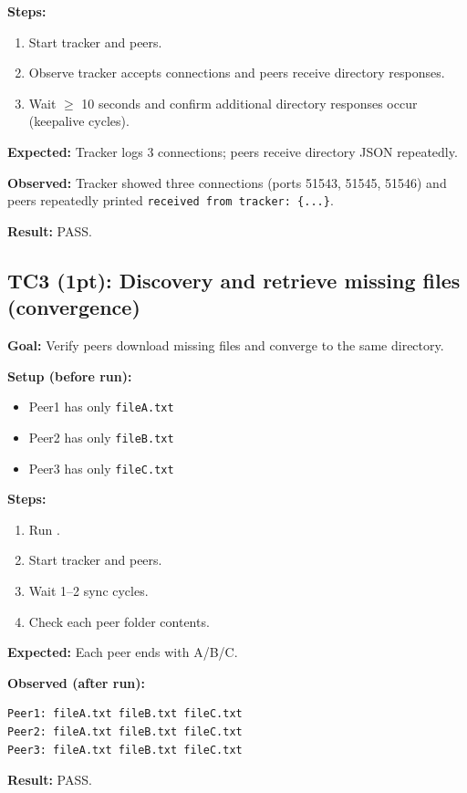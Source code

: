 \documentclass[11pt]{article}
\begin{document}
\textbf{Steps:}
\begin{enumerate}[noitemsep]
  \item Start tracker and peers.
  \item Observe tracker accepts connections and peers receive directory responses.
  \item Wait $\ge$ 10 seconds and confirm additional directory responses occur (keepalive cycles).
\end{enumerate}

\textbf{Expected:} Tracker logs 3 connections; peers receive directory JSON repeatedly.

\textbf{Observed:} Tracker showed three connections (ports 51543, 51545, 51546) and peers repeatedly printed \texttt{received from tracker: \{...\}}.

\textbf{Result:} PASS.

\subsection{TC3 (1pt): Discovery and retrieve missing files (convergence)}
\textbf{Goal:} Verify peers download missing files and converge to the same directory.

\textbf{Setup (before run):}
\begin{itemize}[noitemsep]
  \item Peer1 has only \texttt{fileA.txt}
  \item Peer2 has only \texttt{fileB.txt}
  \item Peer3 has only \texttt{fileC.txt}
\end{itemize}

\textbf{Steps:}
\begin{enumerate}[noitemsep]
  \item Run .
  \item Start tracker and peers.
  \item Wait 1--2 sync cycles.
  \item Check each peer folder contents.
\end{enumerate}

\textbf{Expected:} Each peer ends with A/B/C.

\textbf{Observed (after run):}
\begin{lstlisting}
Peer1: fileA.txt fileB.txt fileC.txt
Peer2: fileA.txt fileB.txt fileC.txt
Peer3: fileA.txt fileB.txt fileC.txt
\end{lstlisting}

\textbf{Result:} PASS.
\end{document}
